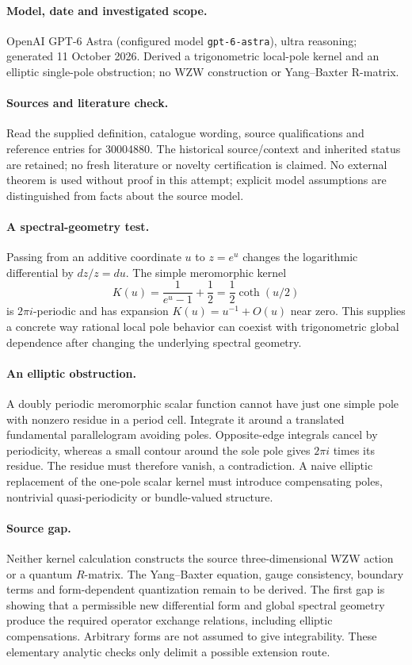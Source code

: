 \documentclass[11pt]{article}
\begin{document}
\paragraph{Model, date and investigated scope.}
OpenAI GPT-6 Astra (configured model \texttt{gpt-6-astra}), ultra reasoning; generated 11 October 2026. Derived a trigonometric local-pole kernel and an elliptic single-pole obstruction; no WZW construction or Yang–Baxter R-matrix.

\paragraph{Sources and literature check.}
Read the supplied definition, catalogue wording, source qualifications and reference entries for 30004880. The historical source/context and inherited status are retained; no fresh literature or novelty certification is claimed. No external theorem is used without proof in this attempt; explicit model assumptions are distinguished from facts about the source model.

\paragraph{A spectral-geometry test.} Passing from an additive coordinate \(u\) to \(z=e^u\) changes the logarithmic differential by \(dz/z=du\). The simple meromorphic kernel
\[
 K(u)=\frac1{e^u-1}+\frac12=\frac12\coth(u/2)
\]
is \(2\pi i\)-periodic and has expansion \(K(u)=u^{-1}+O(u)\) near zero. This supplies a concrete way rational local pole behavior can coexist with trigonometric global dependence after changing the underlying spectral geometry.
\paragraph{An elliptic obstruction.} A doubly periodic meromorphic scalar function cannot have just one simple pole with nonzero residue in a period cell. Integrate it around a translated fundamental parallelogram avoiding poles. Opposite-edge integrals cancel by periodicity, whereas a small contour around the sole pole gives \(2\pi i\) times its residue. The residue must therefore vanish, a contradiction. A naive elliptic replacement of the one-pole scalar kernel must introduce compensating poles, nontrivial quasi-periodicity or bundle-valued structure.
\paragraph{Source gap.} Neither kernel calculation constructs the source three-dimensional WZW action or a quantum \(R\)-matrix. The Yang--Baxter equation, gauge consistency, boundary terms and form-dependent quantization remain to be derived. The first gap is showing that a permissible new differential form and global spectral geometry produce the required operator exchange relations, including elliptic compensations. Arbitrary forms are not assumed to give integrability. These elementary analytic checks only delimit a possible extension route.
\end{document}
